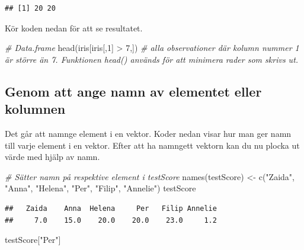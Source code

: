 \documentclass[
]{book}
\newenvironment{Shaded}{\begin{snugshade}}{\end{snugshade}}
\newcommand{\CommentTok}[1]{\textcolor[rgb]{0.56,0.35,0.01}{\textit{#1}}}
\newcommand{\DecValTok}[1]{\textcolor[rgb]{0.00,0.00,0.81}{#1}}
\newcommand{\FunctionTok}[1]{\textcolor[rgb]{0.00,0.00,0.00}{#1}}
\newcommand{\NormalTok}[1]{#1}
\newcommand{\OtherTok}[1]{\textcolor[rgb]{0.56,0.35,0.01}{#1}}
\newcommand{\SpecialCharTok}[1]{\textcolor[rgb]{0.00,0.00,0.00}{#1}}
\newcommand{\StringTok}[1]{\textcolor[rgb]{0.31,0.60,0.02}{#1}}
\begin{document}
\begin{verbatim}
## [1] 20 20
\end{verbatim}

Kör koden nedan för att se resultatet.

\begin{Shaded}
\begin{Highlighting}[]
\CommentTok{\# Data.frame}
\FunctionTok{head}\NormalTok{(iris[iris[,}\DecValTok{1}\NormalTok{] }\SpecialCharTok{\textgreater{}} \DecValTok{7}\NormalTok{,]) }\CommentTok{\# alla observationer där kolumn nummer 1 är större än 7. Funktionen head() används för att minimera rader som skrivs ut. }
\end{Highlighting}
\end{Shaded}

\hypertarget{genom-att-ange-namn-av-elementet-eller-kolumnen}{%
\subsection{Genom att ange namn av elementet eller kolumnen}\label{genom-att-ange-namn-av-elementet-eller-kolumnen}}

Det går att namnge element i en vektor. Koder nedan visar hur man ger namn till varje element i en vektor. Efter att ha namngett vektorn kan du nu plocka ut värde med hjälp av namn.

\begin{Shaded}
\begin{Highlighting}[]
\CommentTok{\# Sätter namn på respektive element i testScore}
\FunctionTok{names}\NormalTok{(testScore) }\OtherTok{\textless{}{-}} \FunctionTok{c}\NormalTok{(}\StringTok{"Zaida"}\NormalTok{, }\StringTok{"Anna"}\NormalTok{, }\StringTok{"Helena"}\NormalTok{, }\StringTok{"Per"}\NormalTok{, }\StringTok{"Filip"}\NormalTok{, }\StringTok{"Annelie"}\NormalTok{)}
\NormalTok{testScore}
\end{Highlighting}
\end{Shaded}

\begin{verbatim}
##   Zaida    Anna  Helena     Per   Filip Annelie 
##     7.0    15.0    20.0    20.0    23.0     1.2
\end{verbatim}

\begin{Shaded}
\begin{Highlighting}[]
\NormalTok{testScore[}\StringTok{"Per"}\NormalTok{]}
\end{Highlighting}
\end{Shaded}
\end{document}
